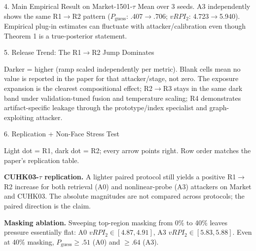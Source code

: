 \documentclass[final]{article}
\newcommand{\fsBody}{\fontsize{25}{29}}   %
\newcommand{\fsSmall}{\fontsize{20}{24}}  %
\newcommand{\smallbody}{\fsBody\selectfont}
\newcommand{\captionfont}{\fsSmall\selectfont\color{muted}}
\newcommand{\mhead}[1]{\textbf{\color{navy}#1}}
\begin{document}
\begin{minipage}[t]{\textwidth}
\begin{minipage}[t]{0.388\textwidth}
\begin{sectionbox}{4. Main Empirical Result on Market-1501-$\tau$}
{\captionfont Mean over 3 seeds. A3 independently shows the same R1$\rightarrow$R2 pattern ($P_{\mathrm{guess}}$: .407$\rightarrow$.706; $vRPI_2$: 4.723$\rightarrow$5.940). Empirical plug-in estimates can fluctuate with attacker/calibration even though Theorem 1 is a true-posterior statement.}
\end{sectionbox}

\vspace{0.09in}
\begin{sectionbox}{5. Release Trend: The R1$\rightarrow$R2 Jump Dominates}
\centering
{}%
\resizebox{0.94\linewidth}{!}{}
\vspace{-0.0794in}

{\captionfont Darker = higher (ramp scaled independently per metric). Blank cells mean no value is reported in the paper for that attacker/stage, not zero. The exposure expansion is the clearest compositional effect; R2$\rightarrow$R3 stays in the same dark band under validation-tuned fusion and temperature scaling; R4 demonstrates artifact-specific leakage through the prototype/index specialist and graph-exploiting attacker.}
\end{sectionbox}

\vspace{0.09in}
\begin{sectionbox}{6. Replication + Non-Face Stress Test}
\centering
{}%
\resizebox{0.94\linewidth}{!}{}
\vspace{-0.0635in}

{\captionfont Light dot = R1, dark dot = R2; every arrow points right. Row order matches the paper's replication table.}

\smallbody
\begin{minipage}[t]{0.49\linewidth}
\mhead{CUHK03-$\tau$ replication.} A lighter paired protocol still yields a positive R1$\rightarrow$R2 increase for both retrieval (A0) and nonlinear-probe (A3) attackers on Market and CUHK03. The absolute magnitudes are not compared across protocols; the paired direction is the claim.
\end{minipage}\hfill
\begin{minipage}[t]{0.49\linewidth}
\mhead{Masking ablation.} Sweeping top-region masking from 0\% to 40\% leaves pressure essentially flat: A0 $vRPI_2\in[4.87,4.91]$, A3 $vRPI_2\in[5.83,5.88]$. Even at 40\% masking, $P_{\mathrm{guess}}\ge .51$ (A0) and $\ge .64$ (A3).
\end{minipage}


\end{sectionbox}
\end{minipage}
\end{minipage}
\end{document}
